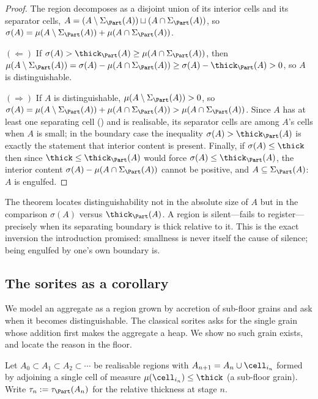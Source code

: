\begin{proof}
The region decomposes as a disjoint union of its interior cells and its
separator cells, $A=(A\setminus\Sigma_\Part(A))\sqcup(A\cap\Sigma_\Part(A))$, so
$\sigma(A)=\mu(A\setminus\Sigma_\Part(A))+\mu(A\cap\Sigma_\Part(A))$.

$(\Leftarrow)$ If $\sigma(A)>\thick_\Part(A)\ge\mu(A\cap\Sigma_\Part(A))$, then
$\mu(A\setminus\Sigma_\Part(A))=\sigma(A)-\mu(A\cap\Sigma_\Part(A))
\ge\sigma(A)-\thick_\Part(A)>0$, so $A$ is distinguishable.

$(\Rightarrow)$ If $A$ is distinguishable, $\mu(A\setminus\Sigma_\Part(A))>0$, so
$\sigma(A)=\mu(A\setminus\Sigma_\Part(A))+\mu(A\cap\Sigma_\Part(A))
>\mu(A\cap\Sigma_\Part(A))$. Since $A$ has at least one separating cell
() and is realisable, its separator cells are among $A$'s
cells when $A$ is small; in the boundary case the inequality
$\sigma(A)>\thick_\Part(A)$ is exactly the statement that interior content is
present. Finally, if $\sigma(A)\le\thick$ then since
$\thick\le\thick_\Part(A)$ would force $\sigma(A)\le\thick_\Part(A)$, the
interior content $\sigma(A)-\mu(A\cap\Sigma_\Part(A))$ cannot be positive, and
$A\subseteq\Sigma_\Part(A)$: $A$ is engulfed.
\end{proof}

\begin{remark}
\label{rem:relative}
The theorem locates distinguishability not in the absolute size of $A$ but in the
comparison $\sigma(A)$ versus $\thick_\Part(A)$. A region is silent---fails to
register---precisely when its separating boundary is thick relative to it. This
is the exact inversion the introduction promised: smallness is never itself the
cause of silence; being engulfed by one's own boundary is.
\end{remark}

\subsection{The sorites as a corollary}

We model an aggregate as a region grown by accretion of sub-floor grains and ask
when it becomes distinguishable. The classical sorites asks for the single grain
whose addition first makes the aggregate a heap. We show no such grain exists,
and locate the reason in the floor.

\begin{construction}
\label{con:accretion}
Let $A_0\subset A_1\subset A_2\subset\cdots$ be realisable regions with
$A_{n+1}=A_n\cup\cell_{i_n}$ formed by adjoining a single cell of measure
$\mu(\cell_{i_n})\le\thick$ \textup{(}a sub-floor grain\textup{)}. Write
$\tau_n:=\tau_\Part(A_n)$ for the relative thickness at stage $n$.
\end{construction}

